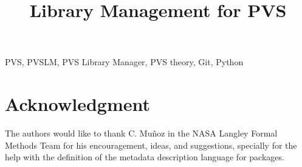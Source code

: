 \documentclass[journal,comsoc]{IEEEtran}
\begin{document}
\title{Library Management for PVS}

\author{
\and
{}
}

\maketitle



\begin{IEEEkeywords}
PVS, PVSLM, PVS Library Manager, PVS theory, Git, Python
\end{IEEEkeywords}

\IEEEpeerreviewmaketitle













\section*{Acknowledgment}
The authors would like to thank
C. Mu\~noz in the NASA Langley Formal Methods Team for his
encouragement, ideas, and suggestions, specially for the help with the
definition of the metadata description language for packages.

\ifCLASSOPTIONcaptionsoff
  \newpage
\fi



\end{document}
